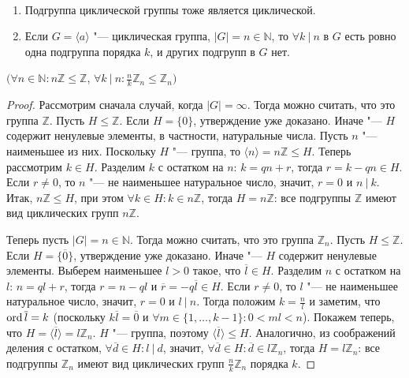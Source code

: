 \begin{theorem}~
	\begin{enumerate}
		\item Подгруппа циклической группы тоже является циклической.
		\item Если $G = \langle a \rangle$ "--- циклическая группа, $|G| = n \in \mathbb{N}$, то $\forall k~|~n$ в $G$ есть ровно одна подгруппа порядка $k$, и других подгрупп в $G$ нет.
	\end{enumerate}
	
	$(\forall n \in \mathbb{N}: n\mathbb{Z} \le \mathbb{Z}$, $\forall k~|~n: \frac{n}{k}\mathbb{Z}_n \le \mathbb{Z}_n)$
\end{theorem}

\begin{proof}
	Рассмотрим сначала случай, когда $|G| = \infty$. Тогда можно считать, что это группа $\mathbb{Z}$. Пусть $H \le \mathbb{Z}$. Если $H = \{0\}$, утверждение уже доказано. Иначе "--- $H$ содержит ненулевые элементы, в частности, натуральные числа. Пусть $n$ "--- наименьшее из них. Поскольку $H$ "--- группа, то $\langle n \rangle = n\mathbb{Z} \le H$. Теперь рассмотрим $k \in H$. Разделим $k$ с остатком на $n$: $k = qn + r$, тогда $r = k - qn \in H$. Если $r \ne 0$, то $n$ "--- не наименьшее натуральное число, значит, $r = 0$ и $n~|~k$. Итак, $n\mathbb{Z} \le H$, при этом $\forall k \in H: k \in n\mathbb{Z}$, тогда $H = n\mathbb{Z}$: все подгруппы $\mathbb{Z}$ имеют вид циклических групп $n\mathbb{Z}$.
	
	Теперь пусть $|G| = n \in \mathbb{N}$. Тогда можно считать, что это группа $\mathbb{Z}_n$. Пусть $H \le \mathbb{Z}$. Если $H = \{\overline{0}\}$, утверждение уже доказано. Иначе "--- $H$ содержит ненулевые элементы. Выберем наименьшее $l > 0$ такое, что $\overline{l} \in H$. Разделим $n$ с остатком на $l$: $n = ql + r$, тогда $r = n - ql$ и $\overline{r} = -q\overline{l} \in H$. Если $r \ne 0$, то $l$ "--- не наименьшее натуральное число, значит, $r = 0$ и $l~|~n$. Тогда положим $k = \frac{n}{l}$ и заметим, что $\operatorname{ord}{\overline{l}} = k$ (поскольку $k\overline{l} = \overline{0}$ и $\forall m \in \{1, \dots, k - 1\}: 0 < ml < n$). Покажем теперь, что $H = \langle\overline{l}\rangle = l\mathbb{Z}_n$. $H$ "--- группа, поэтому $\langle\overline{l}\rangle \le H$. Аналогично, из соображений деления с остатком, $\forall \overline{d} \in H: l~|~d$, значит, $\forall \overline{d} \in H: \overline{d} \in l\mathbb{Z}_n$, тогда $H = l\mathbb{Z}_n$: все подгруппы $\mathbb{Z}_n$ имеют вид циклических групп $\frac{n}{k}\mathbb{Z}_n$ порядка $k$.
\end{proof}


